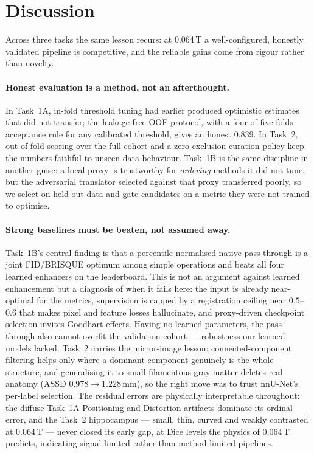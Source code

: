 \documentclass[runningheads]{llncs}
\begin{document}
\FloatBarrier
\section{Discussion}
\label{sec:discussion}

Across three tasks the same lesson recurs: at 0.064\,T a well-configured, honestly
validated pipeline is competitive, and the reliable gains come from rigour rather
than novelty.

\paragraph{Honest evaluation is a method, not an afterthought.}
In Task~1A, in-fold threshold tuning had earlier produced optimistic estimates
that did not transfer; the leakage-free OOF protocol, with a four-of-five-folds
acceptance rule for any calibrated threshold, gives an honest 0.839. In Task~2,
out-of-fold scoring over the full cohort and a zero-exclusion curation policy keep
the numbers faithful to unseen-data behaviour. Task~1B is the same discipline in
another guise: a local proxy is trustworthy for \emph{ordering} methods it did not
tune, but the adversarial translator selected against that proxy transferred
poorly, so we select on held-out data and gate candidates on a metric they were
not trained to optimise.

\paragraph{Strong baselines must be beaten, not assumed away.}
Task~1B's central finding is that a percentile-normalised native pass-through is a
joint FID/BRISQUE optimum among simple operations and beats all four learned
enhancers on the leaderboard. This is not an argument against learned enhancement
but a diagnosis of when it fails here: the input is already near-optimal for the
metrics, supervision is capped by a registration ceiling near $0.5$--$0.6$ that
makes pixel and feature losses hallucinate, and proxy-driven checkpoint selection
invites Goodhart effects. Having no learned parameters, the pass-through also
cannot overfit the validation cohort --- robustness our learned models lacked.
Task~2 carries the mirror-image lesson: connected-component filtering helps only
where a dominant component genuinely is the whole structure, and generalising it
to small filamentous gray matter deletes real anatomy (ASSD
$0.978\!\to\!1.228$\,mm), so the right move was to trust nnU-Net's per-label
selection. The residual errors are physically interpretable throughout: the
diffuse Task~1A Positioning and Distortion artifacts dominate its ordinal error,
and the Task~2 hippocampus --- small, thin, curved and weakly contrasted at
0.064\,T --- never closed its early gap, at Dice levels the physics of 0.064\,T
predicts, indicating signal-limited rather than method-limited pipelines.
\end{document}
